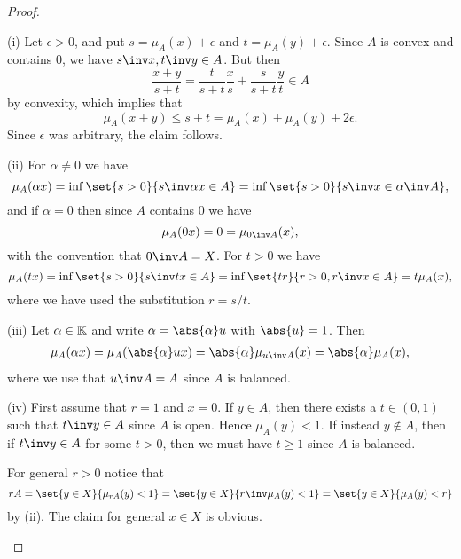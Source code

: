 \documentclass[article, a4paper, 11pt, oneside]{memoir}
\numberwithin{equation}{chapter}
\begin{document}
\begin{proof}
\begin{proofsec}
    \item[(i)]
    Let $\epsilon > 0$, and put $s = \mu_A(x) + \epsilon$ and $t = \mu_A(y) + \epsilon$. Since $A$ is convex and contains $0$, we have $s\inv x, t\inv y \in A$. But then
    \begin{equation*}
        \frac{x+y}{s+t}
            = \frac{t}{s+t} \frac{x}{s} + \frac{s}{s+t} \frac{y}{t}
            \in A
    \end{equation*}
    by convexity, which implies that
    \begin{equation*}
        \mu_A(x + y)
            \leq s + t
            = \mu_A(x) + \mu_A(y) + 2\epsilon.
    \end{equation*}
    Since $\epsilon$ was arbitrary, the claim follows.

    \item[(ii)]
    For $\alpha \neq 0$ we have
    \begin{equation*}
        \mu_A(\alpha x)
            = \inf \set{s > 0}{s\inv \alpha x \in A}
            = \inf \set{s > 0}{s\inv x \in \alpha\inv A},
    \end{equation*}
    and if $\alpha = 0$ then since $A$ contains $0$ we have
    \begin{equation*}
        \mu_A(0x) = 0 = \mu_{0\inv A}(x),
    \end{equation*}
    with the convention that $0\inv A = X$. For $t > 0$ we have
    \begin{equation*}
        \mu_A(t x)
            = \inf \set{s > 0}{s\inv t x \in A}
            = \inf \set{tr}{r > 0, r\inv x \in A}
            = t \mu_A(x),
    \end{equation*}
    where we have used the substitution $r = s/t$.
    
    \item[(iii)]
    Let $\alpha \in \mathbb{K}$ and write $\alpha = \abs{\alpha} u$ with $\abs{u} = 1$. Then
    \begin{align*}
        \mu_A(\alpha x)
            = \mu_A(\abs{\alpha}ux)
            = \abs{\alpha} \mu_{u\inv A}(x)
            = \abs{\alpha} \mu_A(x),
    \end{align*}
    where we use that $u\inv A = A$ since $A$ is balanced.
    
    \item[(iv)]
    First assume that $r = 1$ and $x = 0$. If $y \in A$, then there exists a $t \in (0,1)$ such that $t\inv y \in A$ since $A$ is open. Hence $\mu_A(y) < 1$. If instead $y \not\in A$, then if $t\inv y \in A$ for some $t > 0$, then we must have $t \geq 1$ since $A$ is balanced.
    
    For general $r > 0$ notice that
    \begin{equation*}
        rA
            = \set{y \in X}{\mu_{rA}(y) < 1}
            = \set{y \in X}{r\inv \mu_A(y) < 1}
            = \set{y \in X}{\mu_A(y) < r}
    \end{equation*}
    by (ii). The claim for general $x \in X$ is obvious.
\end{proofsec}
\end{proof}
\end{document}
